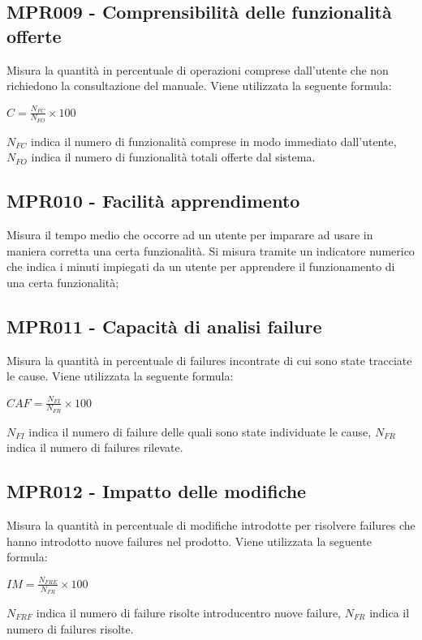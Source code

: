 \subsection{MPR009 - Comprensibilità  delle funzionalità offerte}
Misura la quantità in percentuale di operazioni comprese dall’utente che non richiedono la
consultazione del manuale. Viene utilizzata la seguente formula:
\begin{center}{$C=\frac{N_{FC}}{N_{FO}}\times 100$}\end{center}
${N_{FC}}$ indica il numero di funzionalità comprese in modo immediato dall'utente, ${N_{FO}}$ indica il numero di funzionalità totali offerte dal sistema.
	
\subsection{MPR010 - Facilità apprendimento}
Misura il tempo medio che occorre ad un utente per imparare ad usare in maniera corretta
una certa funzionalità. Si misura tramite un indicatore numerico che indica i minuti
impiegati da un utente per apprendere il funzionamento di una certa funzionalità;

\subsection{MPR011 - Capacità di analisi failure}
Misura la quantità in percentuale di failures incontrate di cui sono state tracciate le cause. Viene
utilizzata la seguente formula:
\begin{center}{$CAF=\frac{N_{FI}}{N_{FR}}\times 100 $}\end{center}
${N_{FI}}$ indica il numero di failure delle quali sono state individuate le cause, ${N_{FR}}$ indica il numero di failures rilevate.

\subsection{MPR012 - Impatto delle modifiche}
Misura la quantità in percentuale di modifiche introdotte per risolvere failures che hanno introdotto nuove failures nel prodotto. Viene utilizzata la seguente formula:
\begin{center}{$IM=\frac{N_{FRE}}{N_{FR}}\times 100 $}\end{center}
${N_{FRF}}$ indica il numero di failure risolte introducentro nuove failure, ${N_{FR}}$ indica il numero di failures risolte.


